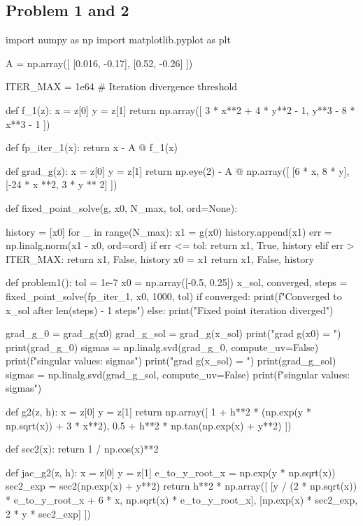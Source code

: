 \documentclass{homework}
\begin{document}
\subsection{Problem 1 and 2}
\begin{python}

import numpy as np
import matplotlib.pyplot as plt

A = np.array([
    [0.016, -0.17],
    [0.52, -0.26]
])

ITER_MAX = 1e64  # Iteration divergence threshold


def f_1(z):
    x = z[0]
    y = z[1]
    return np.array([
        3 * x**2 + 4 * y**2 - 1,
        y**3 - 8 * x**3 - 1
    ])


def fp_iter_1(x):
    return x - A @ f_1(x)

def grad_g(z):
    x = z[0]
    y = z[1]
    return np.eye(2) - A @ np.array([
        [6 * x, 8 * y],
        [-24 * x **2, 3 * y ** 2]
    ])

def fixed_point_solve(g, x0, N_max, tol, ord=None):

    history = [x0]
    for _ in range(N_max):
        x1 = g(x0)
        history.append(x1)
        err = np.linalg.norm(x1 - x0, ord=ord)
        if err <= tol:
            return x1, True, history
        elif err > ITER_MAX:
            return x1, False, history
        x0 = x1
    return x1, False, history


def problem1():
    tol = 1e-7
    x0 = np.array([-0.5, 0.25])
    x_sol, converged, steps = fixed_point_solve(fp_iter_1, x0, 1000, tol)
    if converged:
        print(f"Converged to {x_sol} after {len(steps) - 1} steps")
    else:
        print("Fixed point iteration diverged")

    grad_g_0 = grad_g(x0)
    grad_g_sol = grad_g(x_sol)
    print("grad g(x0) = ")
    print(grad_g_0)
    sigmas = np.linalg.svd(grad_g_0, compute_uv=False)
    print(f"singular values: {sigmas}")
    print("grad g(x_sol) = ")
    print(grad_g_sol)
    sigmas = np.linalg.svd(grad_g_sol, compute_uv=False)
    print(f"singular values: {sigmas}")


def g2(z, h):
    x = z[0]
    y = z[1]
    return np.array([
        1 + h**2 * (np.exp(y * np.sqrt(x)) + 3 * x**2),
        0.5 + h**2 * np.tan(np.exp(x) + y**2)
    ])


def sec2(x):
    return 1 / np.cos(x)**2

def jac_g2(z, h):
    x = z[0]
    y = z[1]
    e_to_y_root_x = np.exp(y * np.sqrt(x))
    sec2_exp = sec2(np.exp(x) + y**2)
    return h**2 * np.array([
        [y / (2 * np.sqrt(x)) * e_to_y_root_x + 6 * x,
            np.sqrt(x) * e_to_y_root_x],
        [np.exp(x) * sec2_exp, 2 * y * sec2_exp]
    ])


\end{python}
\end{document}
